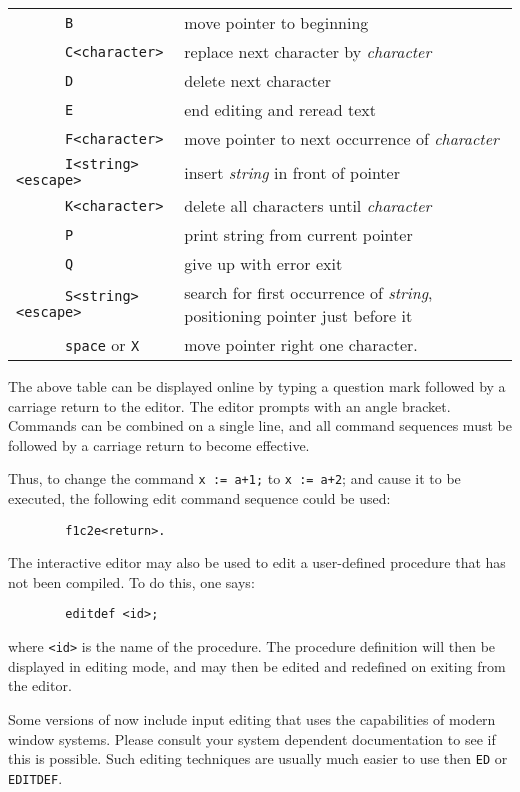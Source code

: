 \begin{tabular}{lp{\rboxwidth}}
{\tt~~~~~  B} & move pointer to beginning \\
{\tt~~~~~  C<character>} & replace next character by
{\em character} \\
{\tt~~~~~  D} & delete next character \\
{\tt~~~~~  E} & end editing and reread text \\
{\tt~~~~~  F<character>} & move pointer to next
occurrence of {\em character} \\[1.7pt]
{\tt~~~~~  I<string><escape>} &
 insert {\em string\/} in front of pointer \\
{\tt~~~~~  K<character>} & delete all characters
 until {\em character} \\
{\tt~~~~~  P} & print string from current pointer \\
{\tt~~~~~  Q} & give up with error exit \\
{\tt~~~~~  S<string><escape>} &
 search for first occurrence of {\em string},
                             positioning pointer just before it \\
{\tt~~~~~  space} or {\tt X} & move pointer right
one character.
\end{tabular}

The above table can be displayed online by typing a question mark followed
by a carriage return to the editor. The editor prompts with an angle
bracket. Commands can be combined on a single line, and all command
sequences must be followed by a carriage return to become effective.

Thus, to change the command {\tt x := a+1;} to {\tt x := a+2}; and cause
it to be executed, the following edit command sequence could be used:
\begin{verbatim}
        f1c2e<return>.
\end{verbatim}
The interactive editor may also be used to edit a user-defined procedure that
has not been compiled.  To do this, one says:
\begin{verbatim}
        editdef <id>;
\end{verbatim}
where {\tt <id>} is the name of the procedure.  The procedure definition
will then be displayed in editing mode, and may then be edited and
redefined on exiting from the editor.

Some versions of {\REDUCE} now include input editing that uses the
capabilities of modern window systems.  Please consult your system
dependent documentation to see if this is possible.  Such editing
techniques are usually much easier to use then {\tt ED} or {\tt EDITDEF}.

